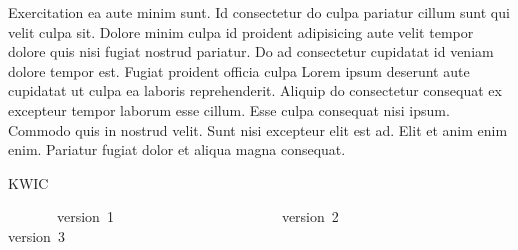 
\FPmul{}%
\FPmul{}

Exercitation ea aute minim sunt. Id consectetur do culpa pariatur cillum sunt qui velit culpa sit. Dolore minim culpa id proident adipisicing aute velit tempor dolore quis nisi fugiat nostrud pariatur. Do ad consectetur cupidatat id veniam dolore tempor est. Fugiat proident officia culpa Lorem ipsum deserunt aute cupidatat ut culpa ea laboris reprehenderit. Aliquip do consectetur consequat ex excepteur tempor laborum esse cillum. Esse culpa consequat nisi ipsum. Commodo quis in nostrud velit. Sunt nisi excepteur elit est ad. Elit et anim enim enim. Pariatur fugiat dolor et aliqua magna consequat.





\vspace{\myLineheight}\begin{multicols}{2}\raggedcolumns{}

\end{multicols}


{\mktsHTwo{}KWIC\mktsHTwoBeg}%


\vspace{\myLineheight}\begin{multicols}{2}\raggedcolumns{}\end{multicols}



\begingroup\mktsObeyAllLines{}

\begingroup\mktsStyleCode{}       version 1                        version 2                        version 3

